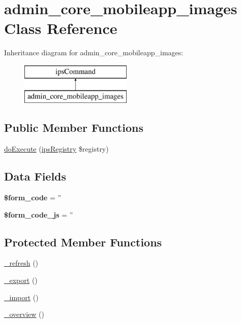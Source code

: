 \hypertarget{classadmin__core__mobileapp__images}{\section{admin\-\_\-core\-\_\-mobileapp\-\_\-images Class Reference}
\label{classadmin__core__mobileapp__images}
}
Inheritance diagram for admin\-\_\-core\-\_\-mobileapp\-\_\-images\-:\begin{figure}[H]
\begin{center}
\leavevmode
\includegraphics[height=2.000000cm]{classadmin__core__mobileapp__images}
\end{center}
\end{figure}
\subsection*{Public Member Functions}
\begin{DoxyCompactItemize}
\item 
\hyperlink{classadmin__core__mobileapp__images_afbc4e912a0604b94d47d66744c64d8ba}{do\-Execute} (\hyperlink{classips_registry}{ips\-Registry} \$registry)
\end{DoxyCompactItemize}
\subsection*{Data Fields}
\begin{DoxyCompactItemize}
\item 
\hypertarget{classadmin__core__mobileapp__images_af28aee726fa3eb6c355d08a2ab655e03}{{\bfseries \$form\-\_\-code} = ''}\label{classadmin__core__mobileapp__images_af28aee726fa3eb6c355d08a2ab655e03}

\item 
\hypertarget{classadmin__core__mobileapp__images_ac68fe8a02a2efd63c3271179f4b4fbb7}{{\bfseries \$form\-\_\-code\-\_\-js} = ''}\label{classadmin__core__mobileapp__images_ac68fe8a02a2efd63c3271179f4b4fbb7}

\end{DoxyCompactItemize}
\subsection*{Protected Member Functions}
\begin{DoxyCompactItemize}
\item 
\hyperlink{classadmin__core__mobileapp__images_afd84c2657855131a311e0c78cf9a1a48}{\-\_\-refresh} ()
\item 
\hyperlink{classadmin__core__mobileapp__images_a7a6db816cd44604446b6d925db4c5bbc}{\-\_\-export} ()
\item 
\hyperlink{classadmin__core__mobileapp__images_aef2877ae44d023c23950a050d0d54892}{\-\_\-import} ()
\item 
\hyperlink{classadmin__core__mobileapp__images_aabb6d8c41c4bc9b71b454491bc1f8db7}{\-\_\-overview} ()
\end{DoxyCompactItemize}
